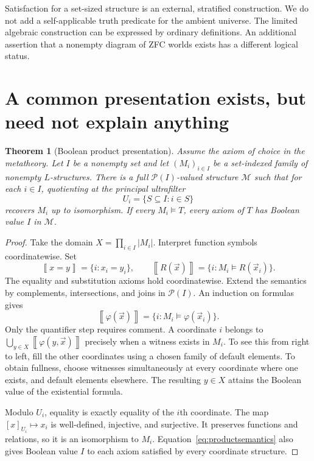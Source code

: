 \documentclass[11pt,letterpaper]{article}
\newtheorem{theorem}{Theorem}[section]
\theoremstyle{definition}
\newcommand{\Pow}{\mathcal P}
\newcommand{\bnorm}[1]{\left\llbracket #1\right\rrbracket}
\begin{document}
Satisfaction for a set-sized structure is an external, stratified construction. We do not add a self-applicable truth predicate for the ambient universe. The limited algebraic construction can be expressed by ordinary definitions. An additional assertion that a nonempty diagram of ZFC worlds exists has a different logical status.

\section{A common presentation exists, but need not explain anything}
\begin{theorem}[Boolean product presentation]\label{thm:product}
Assume the axiom of choice in the metatheory. Let $I$ be a nonempty set and let $(M_i)_{i\in I}$ be a set-indexed family of nonempty $L$-structures. There is a full $\Pow(I)$-valued structure $\mathcal M$ such that for each $i\in I$, quotienting at the principal ultrafilter
\[
U_i=\{S\subseteq I:i\in S\}
\]
recovers $M_i$ up to isomorphism. If every $M_i\models T$, every axiom of $T$ has Boolean value $I$ in $\mathcal M$.
\end{theorem}
\begin{proof}
Take the domain $X=\prod_{i\in I}|M_i|$. Interpret function symbols coordinatewise. Set
\[
\bnorm{x=y}=\{i:x_i=y_i\},\qquad
\bnorm{R(\vec x)}=\{i:M_i\models R(\vec x_i)\}.
\]
The equality and substitution axioms hold coordinatewise. Extend the semantics by complements, intersections, and joins in $\Pow(I)$. An induction on formulas gives
\begin{equation}\label{eq:productsemantics}
\bnorm{\varphi(\vec x)}=\{i:M_i\models\varphi(\vec x_i)\}.
\end{equation}
Only the quantifier step requires comment. A coordinate $i$ belongs to $\bigcup_{y\in X}\bnorm{\varphi(y,\vec x)}$ precisely when a witness exists in $M_i$. To see this from right to left, fill the other coordinates using a chosen family of default elements. To obtain fullness, choose witnesses simultaneously at every coordinate where one exists, and default elements elsewhere. The resulting $y\in X$ attains the Boolean value of the existential formula.

Modulo $U_i$, equality is exactly equality of the $i$th coordinate. The map $[x]_{U_i}\mapsto x_i$ is well-defined, injective, and surjective. It preserves functions and relations, so it is an isomorphism to $M_i$. Equation~\eqref{eq:productsemantics} also gives Boolean value $I$ to each axiom satisfied by every coordinate structure.
\end{proof}
\end{document}
